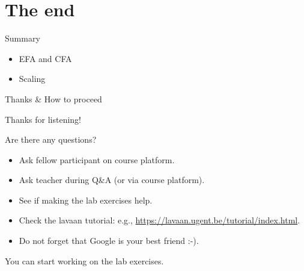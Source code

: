 \documentclass[10pt]{beamer}\usepackage[]{graphicx}\usepackage[]{xcolor}
\begin{document}
\section{The end}
%
%
\begin{frame}{Summary}

  \begin{itemize}
      \item EFA and CFA
      \item Scaling
  \end{itemize}

\end{frame}
%
\begin{frame}{Thanks \& How to proceed}

Thanks for listening!

\vspace*{5mm}

Are there any questions?\\
\begin{itemize}
  \item Ask fellow participant on course platform.
  \item Ask teacher during Q\&A (or via course platform).
  \item See if making the lab exercises help.
  \item Check the lavaan tutorial: e.g., \url{https://lavaan.ugent.be/tutorial/index.html}.
  \item Do not forget that Google is your best friend :-).
\end{itemize}

\vspace*{5mm}

You can start working on the lab exercises.

\end{frame}
%
%
\end{document}
